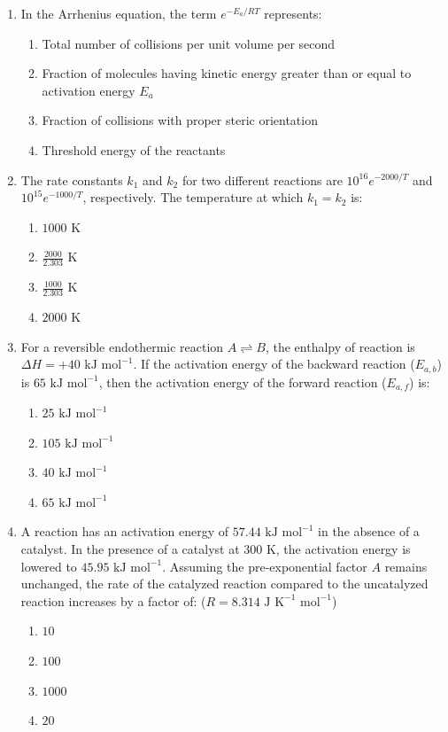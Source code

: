 \documentclass[11pt, a4paper]{article}
\begin{document}
\begin{enumerate}
\item In the Arrhenius equation, the term $e^{-E_a / RT}$ represents:
\begin{enumerate}
    \item Total number of collisions per unit volume per second
    \item Fraction of molecules having kinetic energy greater than or equal to activation energy $E_a$
    \item Fraction of collisions with proper steric orientation
    \item Threshold energy of the reactants
\end{enumerate}

\item The rate constants $k_1$ and $k_2$ for two different reactions are $10^{16} e^{-2000/T}$ and $10^{15} e^{-1000/T}$, respectively. The temperature at which $k_1 = k_2$ is:
\begin{enumerate}
    \item $1000\text{ K}$
    \item $\frac{2000}{2.303}\text{ K}$
    \item $\frac{1000}{2.303}\text{ K}$
    \item $2000\text{ K}$
\end{enumerate}

\item For a reversible endothermic reaction $A \rightleftharpoons B$, the enthalpy of reaction is $\Delta H = +40\text{ kJ mol}^{-1}$. If the activation energy of the backward reaction ($E_{a,b}$) is $65\text{ kJ mol}^{-1}$, then the activation energy of the forward reaction ($E_{a,f}$) is:
\begin{enumerate}
    \item $25\text{ kJ mol}^{-1}$
    \item $105\text{ kJ mol}^{-1}$
    \item $40\text{ kJ mol}^{-1}$
    \item $65\text{ kJ mol}^{-1}$
\end{enumerate}

\item A reaction has an activation energy of $57.44\text{ kJ mol}^{-1}$ in the absence of a catalyst. In the presence of a catalyst at $300\text{ K}$, the activation energy is lowered to $45.95\text{ kJ mol}^{-1}$. Assuming the pre-exponential factor $A$ remains unchanged, the rate of the catalyzed reaction compared to the uncatalyzed reaction increases by a factor of: ($R = 8.314\text{ J K}^{-1}\text{ mol}^{-1}$)
\begin{enumerate}
    \item $10$
    \item $100$
    \item $1000$
    \item $20$
\end{enumerate}


\end{enumerate}
\end{document}
